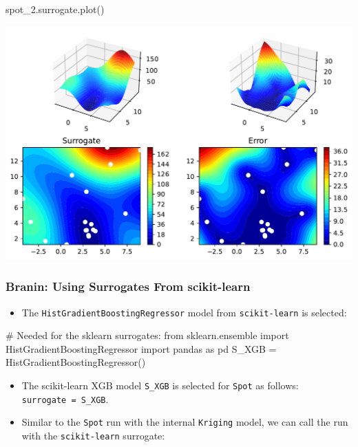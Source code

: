 \documentclass[
  letterpaper,
  DIV=11,
  numbers=noendperiod]{scrreprt}
\newenvironment{Shaded}{\begin{snugshade}}{\end{snugshade}}
\newcommand{\CommentTok}[1]{\textcolor[rgb]{0.37,0.37,0.37}{#1}}
\newcommand{\ImportTok}[1]{\textcolor[rgb]{0.00,0.46,0.62}{#1}}
\newcommand{\NormalTok}[1]{\textcolor[rgb]{0.00,0.23,0.31}{#1}}
\newcommand{\OperatorTok}[1]{\textcolor[rgb]{0.37,0.37,0.37}{#1}}
\providecommand{\tightlist}{%
  \setlength{\itemsep}{0pt}\setlength{\parskip}{0pt}}\usepackage{longtable,booktabs,array}
\begin{document}
\begin{Shaded}
\begin{Highlighting}[]
\NormalTok{spot\_2.surrogate.plot()}
\end{Highlighting}
\end{Shaded}

\includegraphics{010_num_spot_sklearn_surrogate_files/figure-pdf/cell-33-output-1.pdf}

\subsubsection{Branin: Using Surrogates From
scikit-learn}\label{branin-using-surrogates-from-scikit-learn}

\begin{itemize}
\tightlist
\item
  The \texttt{HistGradientBoostingRegressor} model from
  \texttt{scikit-learn} is selected:
\end{itemize}

\begin{Shaded}
\begin{Highlighting}[]
\CommentTok{\# Needed for the sklearn surrogates:}
\ImportTok{from}\NormalTok{ sklearn.ensemble }\ImportTok{import}\NormalTok{ HistGradientBoostingRegressor}
\ImportTok{import}\NormalTok{ pandas }\ImportTok{as}\NormalTok{ pd}
\NormalTok{S\_XGB }\OperatorTok{=}\NormalTok{ HistGradientBoostingRegressor()}
\end{Highlighting}
\end{Shaded}

\begin{itemize}
\tightlist
\item
  The scikit-learn XGB model \texttt{S\_XGB} is selected for
  \texttt{Spot} as follows: \texttt{surrogate\ =\ S\_XGB}.
\item
  Similar to the \texttt{Spot} run with the internal \texttt{Kriging}
  model, we can call the run with the \texttt{scikit-learn} surrogate:
\end{itemize}
\end{document}
